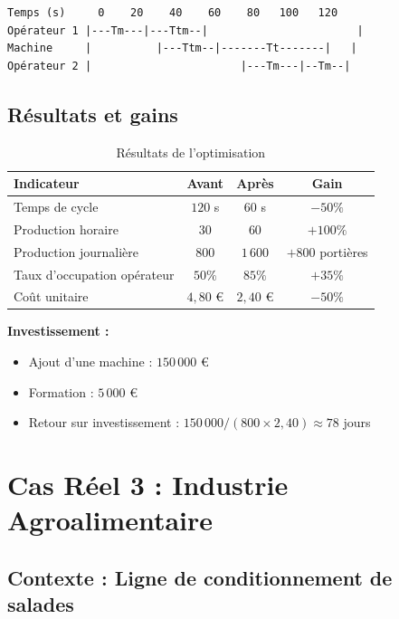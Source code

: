 \documentclass[a4paper,12pt]{article}
\begin{document}
\begin{center}
\begin{minipage}{0.9\textwidth}
\begin{verbatim}
Temps (s)     0    20    40    60    80   100   120
Opérateur 1 |---Tm---|---Ttm--|                       |
Machine     |          |---Ttm--|-------Tt-------|   |
Opérateur 2 |                       |---Tm---|--Tm--|
\end{verbatim}
\caption{Représentation simplifiée du simogramme après optimisation}
\end{minipage}
\end{center}

\subsection{Résultats et gains}

\begin{table}[ht]
\centering
\begin{tabular}{|l|c|c|c|}
\hline
\textbf{Indicateur} & \textbf{Avant} & \textbf{Après} & \textbf{Gain} \\
\hline
Temps de cycle & $120$ s & $60$ s & $-50\%$ \\
Production horaire & $30$ & $60$ & $+100\%$ \\
Production journalière & $800$ & $1\,600$ & $+800$ portières \\
Taux d'occupation opérateur & $50\%$ & $85\%$ & $+35\%$ \\
Coût unitaire & $4,80$ € & $2,40$ € & $-50\%$ \\
\hline
\end{tabular}
\caption{Résultats de l'optimisation}
\end{table}

\textbf{Investissement :}
\begin{itemize}
    \item Ajout d'une machine : $150\,000$ €
    \item Formation : $5\,000$ €
    \item Retour sur investissement : $150\,000 / (800 \times 2,40) \approx 78$ jours
\end{itemize}

\section{Cas Réel 3 : Industrie Agroalimentaire}

\subsection{Contexte : Ligne de conditionnement de salades}
\end{document}
